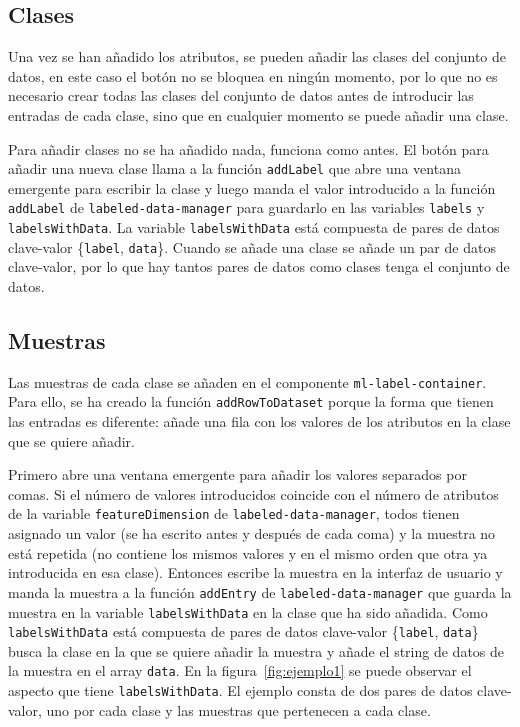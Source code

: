 \documentclass[a4paper, 12pt]{book}
\begin{document}
\subsection{Clases}
\label{subsec:clases}

Una vez se han añadido los atributos, se pueden añadir las clases del conjunto de datos, en este caso el botón no se bloquea en ningún momento, por lo que no es necesario crear todas las clases del conjunto de datos antes de introducir las entradas de cada clase, sino que en cualquier momento se puede añadir una clase. 

Para añadir clases no se ha añadido nada, funciona como antes. 
El botón para añadir una nueva clase llama a la función \texttt{addLabel} que abre una ventana emergente para escribir la clase y luego manda el valor introducido a la función \texttt{addLabel} de \texttt{labeled-data-manager} para guardarlo en las variables \texttt{labels} y \texttt{labelsWithData}. 
La variable \texttt{labelsWithData} está compuesta de pares de datos clave-valor \{\texttt{label}, \texttt{data}\}. Cuando se añade una clase se añade un par de datos clave-valor, por lo que hay tantos pares de datos como clases tenga el conjunto de datos.

\subsection{Muestras}
\label{subsec:datos}

Las muestras de cada clase se añaden en el componente \texttt{ml-label-container}. Para ello, se ha creado la función \texttt{addRowToDataset} porque la forma que tienen las entradas es diferente: añade una fila con los valores de los atributos en la clase que se quiere añadir. 

Primero abre una ventana emergente para añadir los valores separados por comas. Si el número de valores introducidos coincide con el número de atributos de la variable \texttt{featureDimension} de \texttt{labeled-data-manager}, todos tienen asignado un valor (se ha escrito antes y después de cada coma) y la muestra no está repetida (no contiene los mismos valores y en el mismo orden que otra ya introducida en esa clase). Entonces escribe la muestra en la interfaz de usuario y manda la muestra a la función \texttt{addEntry} de \texttt{labeled-data-manager} que guarda la muestra en la variable \texttt{labelsWithData} en la clase que ha sido añadida. Como \texttt{labelsWithData} está compuesta de pares de datos clave-valor \{\texttt{label}, \texttt{data}\} busca la clase en la que se quiere añadir la muestra y añade el string de datos de la muestra en el array \texttt{data}. 
En la figura~\ref{fig:ejemplo1} se puede observar el aspecto que tiene \texttt{labelsWithData}. El ejemplo consta de dos pares de datos clave-valor, uno por cada clase y las muestras que pertenecen a cada clase.
\end{document}
